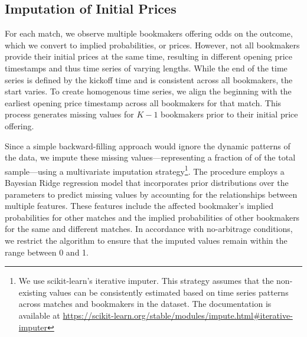\documentclass[webpdf,modern,medium]{oup-authoring-template}
\newcommand{\var}[1]{\DTLfetch{values}{thekey}{#1}{thevalue}} %
\theoremstyle{thmstyleone}%
\theoremstyle{thmstyletwo}%
\theoremstyle{thmstylethree}%
\begin{document}
\begin{appendices}
\clearpage

    \section{Imputation of Initial Prices}
    \label{appx:imputation}

        For each match, we observe multiple bookmakers offering odds on the outcome, which we convert to implied probabilities, or prices. However, not all bookmakers provide their initial prices at the same time, resulting in different opening price timestamps and thus time series of varying lengths. While the end of the time series is defined by the kickoff time and is consistent across all bookmakers, the start varies. To create homogenous time series, we align the beginning with the earliest opening price timestamp across all bookmakers for that match. This process generates missing values for $K-1$ bookmakers prior to their initial price offering.

        Since a simple backward-filling approach would ignore the dynamic patterns of the data, we impute these missing values---representing a fraction of \var{frac_missings} of the total sample---using a multivariate imputation strategy\footnote{We use scikit-learn's iterative imputer. This strategy assumes that the non-existing values can be consistently estimated based on time series patterns across matches and bookmakers in the dataset. The documentation is available at \url{https://scikit-learn.org/stable/modules/impute.html\#iterative-imputer}}.
        The procedure employs a Bayesian Ridge regression model that incorporates prior distributions over the parameters to predict missing values by accounting for the relationships between multiple features. These features include the affected bookmaker's implied probabilities for other matches and the implied probabilities of other bookmakers for the same and different matches. In accordance with no-arbitrage conditions, we restrict the algorithm to ensure that the imputed values remain within the range between 0 and 1.


\end{appendices}
\end{document}
